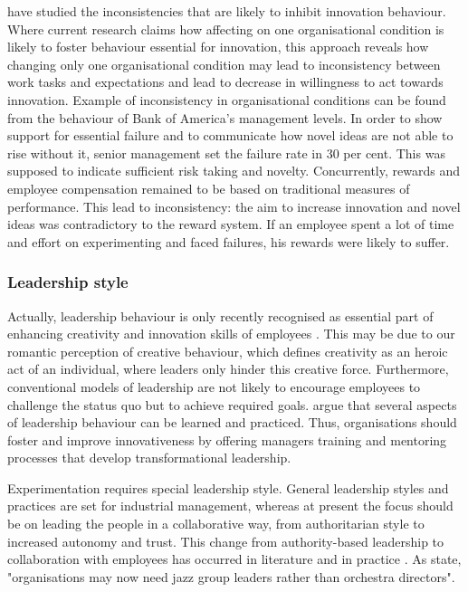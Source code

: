 \citet{lee2004mixed} have studied the inconsistencies that are likely to inhibit innovation behaviour. Where current research claims how affecting on one organisational condition is likely to foster behaviour essential for innovation, this approach reveals how changing only one organisational condition may lead to inconsistency between work tasks and expectations and lead to decrease in willingness to act towards innovation. Example of inconsistency in organisational conditions can be found from the behaviour of Bank of America's management levels. In order to show support for essential failure and to communicate how novel ideas are not able to rise without it, senior management set the failure rate in 30 per cent. This was supposed to indicate sufficient risk taking and novelty. Concurrently, rewards and employee compensation remained to be based on traditional measures of performance. This lead to inconsistency: the aim to increase innovation and novel ideas was contradictory to the reward system. If an employee spent a lot of time and effort on experimenting and faced failures, his rewards were likely to suffer. \citep{lee2004mixed} 

\subsubsection{Leadership style}
Actually, leadership behaviour is only recently recognised as essential part of enhancing creativity and innovation skills of employees \citep{mumford2002leading}. This may be due to our romantic perception of creative behaviour, which defines creativity as an heroic act of an individual, where leaders only hinder this creative force. Furthermore, conventional models of leadership are not likely to encourage employees to challenge the status quo but to achieve required goals.\citep{mumford2002leading} \citet{jung2003role} argue that several aspects of leadership behaviour can be learned and practiced. Thus, organisations should foster and improve innovativeness by offering managers training and mentoring processes that develop transformational leadership. 

Experimentation requires special leadership style. General leadership styles and practices are set for industrial management, whereas at present the focus should be on leading the people in a collaborative way, from authoritarian style to increased autonomy and trust. This change from authority-based leadership to collaboration with employees has occurred in literature and in practice \citep{amabile2008creativity,farson2002failuretolerantleader}. As \citet{mumford2002leading} state, "organisations may now need jazz group leaders rather than orchestra directors". 

